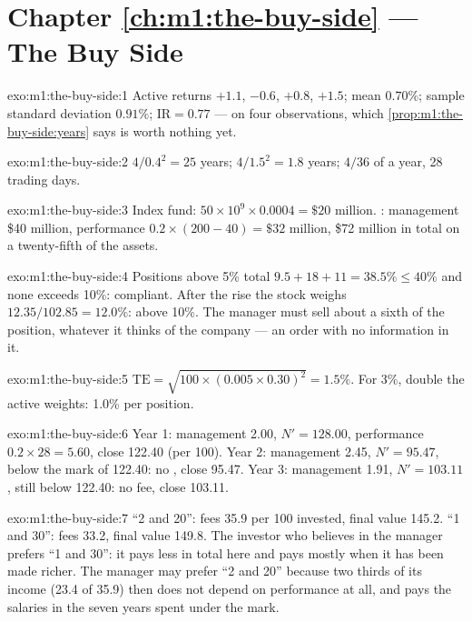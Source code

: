 \section*{Chapter \ref{ch:m1:the-buy-side} --- The Buy Side}

\begin{solution}{exo:m1:the-buy-side:1}
Active returns $+1.1$, $-0.6$, $+0.8$, $+1.5$; mean $0.70\%$; sample standard
deviation $0.91\%$; $\mathrm{IR} = 0.77$ --- on four observations, which
\cref{prop:m1:the-buy-side:years} says is worth nothing yet.
\end{solution}

\begin{solution}{exo:m1:the-buy-side:2}
$4/0.4^2 = 25$ years; $4/1.5^2 = 1.8$ years; $4/36$ of a year, 28 trading
days.
\end{solution}

\begin{solution}{exo:m1:the-buy-side:3}
Index fund: $50 \times 10^9 \times 0.0004 = \$20$ million. :
management \$40 million, performance $0.2 \times (200 - 40) = \$32$ million,
\$72 million in total on a twenty-fifth of the assets.
\end{solution}

\begin{solution}{exo:m1:the-buy-side:4}
Positions above 5\% total $9.5 + 18 + 11 = 38.5\% \le 40\%$ and none exceeds
10\%: compliant. After the rise the stock weighs $12.35/102.85 = 12.0\%$:
above 10\%. The manager must sell about a sixth of the position, whatever it
thinks of the company --- an order with no information in it.
\end{solution}

\begin{solution}{exo:m1:the-buy-side:5}
$\mathrm{TE} = \sqrt{100 \times (0.005\times0.30)^2} = 1.5\%$. For 3\%, double
the active weights: 1.0\% per position.
\end{solution}

\begin{solution}{exo:m1:the-buy-side:6}
Year 1: management 2.00, $N' = 128.00$, performance $0.2\times28 = 5.60$,
close 122.40 (per 100). Year 2: management 2.45, $N' = 95.47$, below the mark
of 122.40: no , close 95.47. Year 3: management 1.91, $N' =
103.11$, still below 122.40: no fee, close 103.11.
\end{solution}

\begin{solution}{exo:m1:the-buy-side:7}
``2 and 20'': fees 35.9 per 100 invested, final value 145.2. ``1 and 30'':
fees 33.2, final value 149.8. The investor who believes in the manager
prefers ``1 and 30'': it pays less in total here and pays mostly when it has
been made richer. The manager may prefer ``2 and 20'' because two thirds of
its income (23.4 of 35.9) then does not depend on performance at all, and
pays the salaries in the seven years spent under the mark.
\end{solution}


